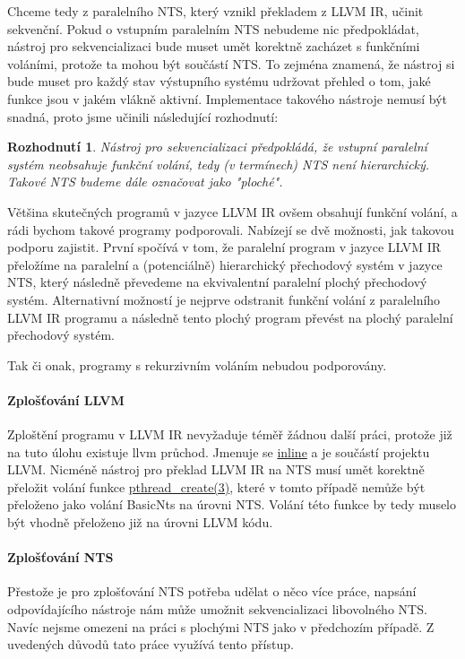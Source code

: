 \documentclass[10pt,a4paper,notitlepage]{report}
\newtheorem{decision}{Rozhodnutí}
\begin{document}
Chceme tedy z paralelního NTS, který vznikl překladem z LLVM IR, učinit sekvenční. Pokud o vstupním paralelním NTS nebudeme nic předpokládat, nástroj pro sekvencializaci bude muset umět korektně zacházet s funkčními voláními, protože ta mohou být součástí NTS. To zejména znamená, že nástroj si bude muset pro každý stav výstupního systému udržovat přehled o tom, jaké funkce jsou v jakém vlákně aktivní. Implementace takového nástroje nemusí být snadná, proto jsme učinili následující rozhodnutí:

\begin{decision}
Nástroj pro sekvencializaci předpokládá, že vstupní paralelní systém neobsahuje funkční volání, tedy (v termínech) NTS není hierarchický. Takové NTS budeme dále označovat jako "ploché".
\end{decision}

Většina skutečných programů v jazyce LLVM IR ovšem obsahují funkční volání, a rádi bychom takové programy podporovali. Nabízejí se dvě možnosti, jak takovou podporu zajistit. První spočívá v tom, že paralelní program v jazyce LLVM IR přeložíme na paralelní a (potenciálně) hierarchický přechodový systém v jazyce NTS, který následně převedeme na ekvivalentní paralelní plochý přechodový systém. Alternativní možností je nejprve odstranit funkční volání z paralelního LLVM IR programu a následně tento plochý program převést na plochý paralelní přechodový systém.

Tak či onak, programy s rekurzivním voláním nebudou podporovány.

\paragraph{Zplošťování LLVM}
Zploštění programu v LLVM IR nevyžaduje téměř žádnou další práci, protože již na tuto úlohu existuje llvm průchod. Jmenuje se
\href{http://llvm.org/docs/Passes.html#inline-function-integration-inlining}
{inline} a je součástí projektu LLVM. Nicméně nástroj pro překlad LLVM IR na NTS musí umět korektně přeložit volání funkce
\href{http://man7.org/linux/man-pages/man3/pthread_create.3.html}
{pthread_create(3)}, které v tomto případě nemůže být přeloženo jako volání BasicNts na úrovni NTS. Volání této funkce by tedy muselo být vhodně přeloženo již na úrovni LLVM kódu.

\paragraph{Zplošťování NTS}
Přestože je pro zplošťování NTS potřeba udělat o něco více práce, napsání odpovídajícího nástroje nám může umožnit sekvencializaci libovolného NTS. Navíc nejsme omezeni na práci s plochými NTS jako v předchozím případě. Z uvedených důvodů tato práce využívá tento přístup.
\end{document}
